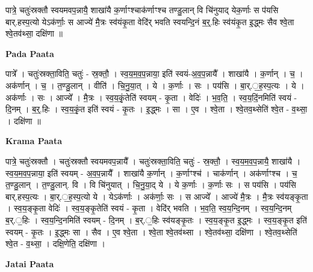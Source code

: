 \documentclass[17pt]{extarticle}
\begin{document}
पात्रे॒ चतुः॑स्रक्तौ स्वयमवप॒न्नायै॒ शाखा॑यै क॒र्णाꣳश्चाक॑र्णाꣳश्च तण्डु॒लान् वि चि॑नुयाद् येक॒र्णाः स प॑यसि बार्.हस्प॒त्यो येऽक॑र्णाः॒ स आज्ये॑ मै॒त्रः स्व॑यंकृ॒ता वेदि॑र् भवति स्वयन्दि॒॒नं ब॒र्॒.हिः स्व॑यंकृ॒त इ॒द्ध्मः सैव श्वे॒ता श्वे॒तव॑थ्सा॒ दक्षि॑णा ॥ \newline

\textbf{Pada Paata} \newline

पात्रे᳚ । चतुः॑स्रक्ता॒विति॒ चतुः॑ - स्र॒क्तौ॒ । स्व॒य॒म॒व॒प॒न्नाया॒ इति॑ स्वयं-अ॒व॒प॒न्नायै᳚ । शाखा॑यै । क॒र्णान् । च॒ । अक॑र्णान् । च॒ । त॒ण्डु॒लान् । वीति॑ । चि॒नु॒या॒त् । ये । क॒र्णाः । सः । पय॑सि । बा॒र्.॒ह॒स्प॒त्यः । ये । अक॑र्णाः । सः । आज्ये᳚ । मै॒त्रः । स्व॒य॒कृं॒तेति॑ स्वयम् - कृ॒ता । वेदिः॑ । भ॒व॒ति॒ । स्व॒य॒दिं॒नमिति॑ स्वयं - दि॒नम् । ब॒र्॒.हिः । स्व॒य॒कृं॒त इति॑ स्वयं - कृ॒तः । इ॒द्ध्मः । सा । ए॒व । श्वे॒ता । श्वे॒तव॒थ्सेति॑ श्वे॒त - व॒थ्सा॒ । दक्षि॑णा ॥  \newline


\textbf{Krama Paata} \newline

पात्रे॒ चतुः॑स्रक्तौ । चतुः॑स्रक्तौ स्वयमवप॒न्नायै᳚ । चतुः॑स्रक्ता॒विति॒ चतुः॑ - स्र॒क्तौ॒ । स्व॒य॒म॒व॒प॒न्नायै॒ शाखा॑यै । स्व॒य॒म॒व॒प॒न्नाया॒ इति॑ स्वयम् - अ॒व॒प॒न्नायै᳚ । शाखा॑यै क॒र्णान् । क॒र्णाꣳश्च॑ । चाक॑र्णान् । अक॑र्णाꣳश्च । च॒ त॒ण्डु॒लान् । त॒ण्डु॒लान्. वि । वि चि॑नुयात् । चि॒नु॒या॒द् ये । ये क॒र्णाः । क॒र्णाः सः । स पय॑सि । पय॑सि बार्.हस्प॒त्यः । बा॒र्.॒ह॒स्प॒त्यो ये । येऽक॑र्णाः । अक॑र्णाः॒ सः । स आज्ये᳚ । आज्ये॑ मै॒त्रः । मै॒त्रः स्व॑यङ्कृ॒ता । स्व॒य॒ङ्कृ॒ता वेदिः॑ । स्व॒य॒ङ्कृ॒तेति॑ स्वयं - कृ॒ता । वेदि॑र् भवति । भ॒व॒ति॒ स्व॒य॒न्दि॒नम् । स्व॒य॒न्दि॒नम् ब॒र्.॒हिः । स्व॒य॒न्दि॒नमिति॑ स्वयम् - दि॒नम् । ब॒र्.॒हिः स्व॑यङ्कृ॒तः । स्व॒य॒ङ्कृ॒त इ॒द्ध्मः । स्व॒य॒ङ्कृ॒त इति॑ स्वयम् - कृ॒तः । इ॒द्ध्मः सा । सैव । ए॒व श्वे॒ता । श्वे॒ता श्वे॒तव॑थ्सा । श्वे॒तव॑थ्सा॒ दक्षि॑णा । श्वे॒तव॒थ्सेति॑ श्वे॒त - व॒थ्सा॒ । दक्षि॒णेति॒ दक्षि॑णा । \newline

\textbf{Jatai Paata} \newline
\end{document}
